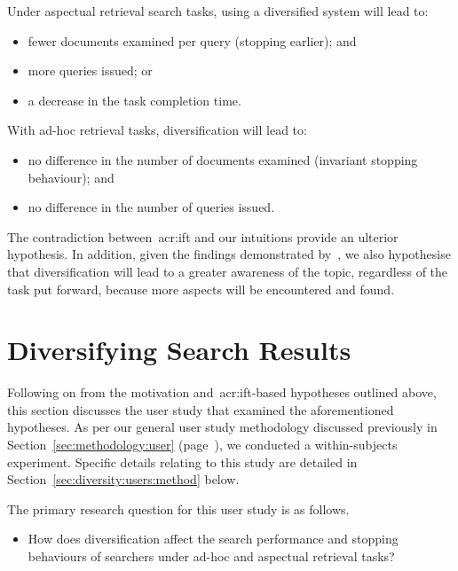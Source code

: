 Under aspectual retrieval search tasks, using a diversified system  will lead to:
\begin{itemize}
    \item{ fewer documents examined per query (stopping earlier); and}
    \item{ more queries issued; or}
    \item{ a decrease in the task completion time.}
\end{itemize}

With ad-hoc retrieval  tasks, diversification will lead to:
\begin{itemize}
    \item{ no difference in the number of documents examined (invariant stopping behaviour); and}
    \item{ no difference in the number of queries issued.}
\end{itemize}

The contradiction between~\gls{acr:ift} and our intuitions provide an ulterior hypothesis. In addition, given the findings demonstrated by~\cite{syed2017sal}, we also hypothesise that diversification will lead to a greater awareness of the topic, regardless of the task put forward, because more aspects will be encountered and found.

\section{Diversifying Search Results}\label{sec:diversity:users}
Following on from the motivation and~\gls{acr:ift}-based hypotheses outlined above, this section discusses the user study that examined the aforementioned hypotheses. As per our general user study methodology discussed previously in Section~\ref{sec:methodology:user} (page~\pageref{sec:methodology:user}), we conducted a within-subjects experiment. Specific details relating to this study are detailed in Section~\ref{sec:diversity:users:method} below.

The primary research question for this user study is as follows.

\begin{itemize}
    \item{ How does diversification affect the search performance and stopping behaviours of searchers under ad-hoc and aspectual retrieval tasks?}
\end{itemize}

